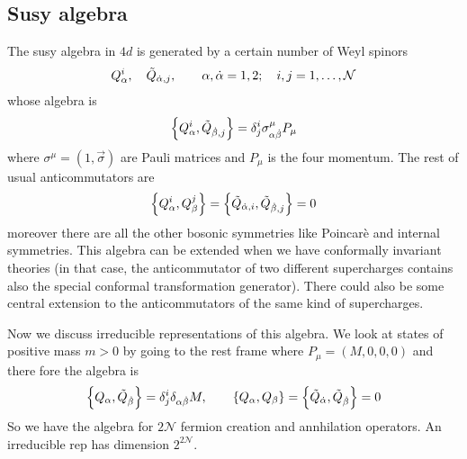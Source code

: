 \documentclass[11pt]{article}
\theoremstyle{definition}
\numberwithin{equation}{section}
\newcommand*\cN{\mathcal{N}}
\begin{document}
\subsection{Susy algebra}
The susy algebra in $4d$ is generated by a certain number of Weyl spinors 
\begin{equation}
	Q_{\alpha}^{i},\quad\Tilde{Q}_{\dot\alpha, j},\qquad \alpha,\dot\alpha=1,2;\quad i,j=1,\ldots,\cN
\end{equation}
whose algebra is 
\begin{equation}
	\acomm{Q_{\alpha}^{i}}{\tilde{Q}_{\dot\beta,j}}=\delta^{i}_{j}\sigma^{\mu}_{\alpha\dot\beta}P_{\mu}
\end{equation}
where $\sigma^{\mu}=(1,\vec{\sigma})$ are Pauli matrices and $P_{\mu}$ is the four momentum. The rest of usual anticommutators are
\begin{equation}
	\acomm{Q_{\alpha}^{i}}{Q_{\beta}^{j}}=\acomm{\tilde{Q}_{\dot\alpha,i}}{\tilde{Q}_{\dot\beta,j}}=0
\end{equation}
moreover there are all the other bosonic symmetries like Poincarè and internal symmetries. This algebra can be extended when we have conformally invariant theories (in that case, the anticommutator of two different supercharges contains also the special conformal transformation generator). There could also be some central extension to the anticommutators of the same kind of supercharges.

Now we discuss irreducible representations of this algebra. We look at states of positive mass $m>0$ by going to the rest frame where $P_{\mu}=(M,0,0,0)$ and there fore the algebra is
\begin{equation}
	\acomm{Q_{\alpha}}{\tilde{Q}_{\dot\beta}}=\delta^{i}_{j}\delta_{\alpha\dot\beta}M,\qquad \acomm{Q_{\alpha}}{Q_{\beta}}=\acomm{\tilde{Q}_{\dot\alpha}}{\tilde{Q}_{\dot\beta}}=0
\end{equation}
So we have the algebra for $2\cN$ fermion creation and annhilation operators. An irreducible rep has dimension $2^{2\cN}$.
\end{document}
